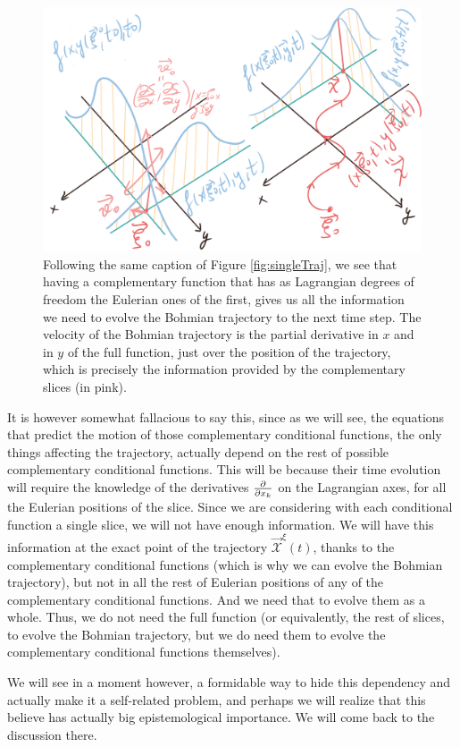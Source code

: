 \documentclass[11pt, a4paper]{article} %
\newcommand{\x}{\mathcal{X}}
\begin{document}
\begin{figure}[h!]
  \centering
    \includegraphics[width=0.65\linewidth]{bohmian_pair.png}
  \caption{Following the same caption of Figure \ref{fig:singleTraj}, we see that having a complementary function that has as Lagrangian degrees of freedom the Eulerian ones of the first, gives us all the information we need to evolve the Bohmian trajectory to the next time step. The velocity of the Bohmian trajectory is the partial derivative in $x$ and in $y$ of the full function, just over the position of the trajectory, which is precisely the information provided by the complementary slices (in pink). }
  \label{fig:pair_bohm}
\end{figure}

It is however somewhat fallacious to say this, since as we will see, the equations that predict the motion of those complementary conditional functions, the only things affecting the trajectory, actually depend on the rest of possible complementary conditional functions. This will be because their time evolution will require the knowledge of the derivatives $\pdv{}{x_k}$ on the Lagrangian axes, for all the Eulerian positions of the slice. Since we are considering with each conditional function a single slice, we will not have enough information. We will have this information at the exact point of the trajectory $\vec{\x}^\xi(t)$, thanks to the complementary conditional functions (which is why we can evolve the Bohmian trajectory), but not in all the rest of Eulerian positions of any of the complementary conditional functions. And we need that to evolve them as a whole. Thus, we do not need the full function (or equivalently, the rest of slices, to evolve the Bohmian trajectory, but we do need them to evolve the complementary conditional functions themselves).

We will see in a moment however, a formidable way to hide this dependency and actually make it a self-related problem, and perhaps we will realize that this believe has actually big epistemological importance. We will come back to the discussion there.
\end{document}

